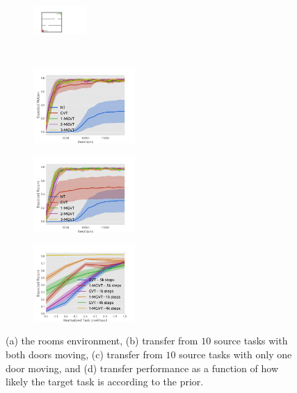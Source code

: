 \documentclass{article}
\begin{document}
\begin{figure}[t] 
  \begin{subfigure}[b]{0.15\textwidth}
    \includegraphics[trim=0.0cm 0.2cm 0.0cm 0.2cm,clip=true,height=2.6cm, width=2.0cm]{images/rooms2.pdf}
    \caption{}
  \end{subfigure}
  \begin{subfigure}[b]{0.27\textwidth}
    \includegraphics[trim=0.5cm 0cm 1.8cm 1.3cm,clip=true,height=2.9cm]{images/three-room/lrev.pdf}
    \caption{}
  \end{subfigure}
    \begin{subfigure}[b]{0.27\textwidth}
    \includegraphics[trim=0.5cm 0cm 1.6cm 1.3cm,clip=true,height=2.9cm]{images/three-room-gen/lrev.pdf}
    \caption{}
  \end{subfigure}
    \begin{subfigure}[b]{0.27\textwidth}
    \includegraphics[trim=0.5cm 0cm 1.6cm 1.3cm,clip=true,height=2.9cm]{images/likelihood/lrew.pdf}
    \caption{}
  \end{subfigure}
  \caption{(a) the rooms environment, (b) transfer from $10$ source tasks with both doors moving, (c) transfer from $10$ source tasks with only one door moving, and (d) transfer performance as a function of how likely the target task is according to the prior.}
  \label{fig:dipfdbsgraphplots}
\end{figure}
\end{document}
